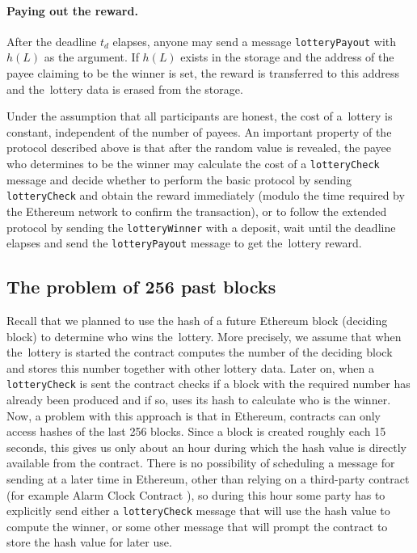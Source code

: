 \documentclass[a4paper]{article}
\begin{document}
    \paragraph{Paying out the reward.}
    After the deadline $t_d$ elapses, anyone may send a message \texttt{lotteryPayout} with $h(L)$ as the argument.
    If $h(L)$ exists in the storage and the address of the payee claiming to be the winner is set, the reward is
    transferred to this address and the~lottery data is erased from the storage.

    Under the assumption that all participants are honest, the cost of a~lottery is constant, independent of the number
    of payees.
    An important property of the protocol described above is that after the random value is revealed, the payee who
    determines to be the winner may calculate the cost of a \texttt{lotteryCheck} message and decide whether to perform
    the basic protocol by sending \texttt{lotteryCheck} and obtain the reward immediately (modulo the time required by
    the Ethereum network to confirm the transaction), or to follow the extended protocol by sending the
    \texttt{lotteryWinner} with a deposit, wait until the deadline elapses and send the \texttt{lotteryPayout} message
    to get the~lottery reward.
\subsection{The problem of 256 past blocks}
    \label{sec:problem256}
    Recall that we planned to use the hash of a future Ethereum block (deciding block) to determine who wins
    the~lottery. More precisely, we assume that when the~lottery is started the contract computes the number
    of the deciding block and stores this number together with other lottery data. Later on, when a
    \texttt{lotteryCheck} is sent the contract checks if a block with the required number has already been
    produced and if so, uses its hash to calculate who is the winner. Now, a problem with this approach is that in
    Ethereum, contracts can only access hashes of the last 256 blocks. Since a block is created roughly each 15
    seconds, this gives us only about an hour during which the hash value is directly available from the contract.
    There is no possibility of scheduling a message for sending at a later time in Ethereum, other than relying on
    a third-party contract (for example Alarm Clock Contract \cite{ALARM}), so during this hour some party has
    to explicitly send either a \texttt{lotteryCheck} message that will use the hash value to compute the winner,
    or some other message that will prompt the contract to store the hash value for later use.
\end{document}
